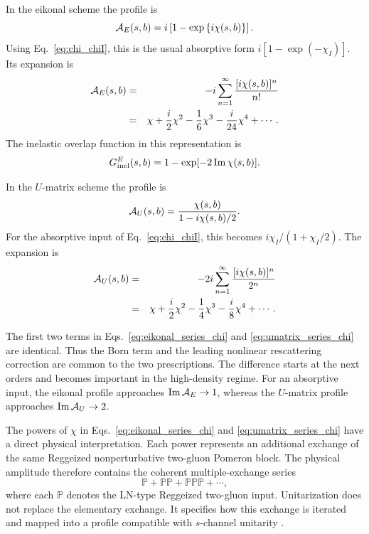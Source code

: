 \documentclass[aps,prd,twocolumn,superscriptaddress,longbibliography,nofootinbib]{revtex4-2}
\begin{document}
In the eikonal scheme the profile is
\begin{equation}
{\cal A}_E(s,b)
=
i\left[
1-\exp\left\{i\chi(s,b)\right\}
\right].
\label{eq:eikonal_profile}
\end{equation}
Using Eq.~\eqref{eq:chi_chiI}, this is the usual absorptive form
$i[1-\exp(-\chi_I)]$. Its expansion is
\begin{eqnarray}
{\cal A}_E(s,b) &=& -i\sum_{n=1}^{\infty} \frac{[i\chi(s,b)]^n}{n!} \nonumber \\
 &=& \chi + \frac{i}{2}\chi^2 - \frac{1}{6}\chi^3 - \frac{i}{24}\chi^4 + \cdots .
\label{eq:eikonal_series_chi}
\end{eqnarray}
The inelastic overlap function in this representation is
\begin{equation}
G_{\rm inel}^{E}(s,b) = 1-\exp[-2\,\mbox{Im}\,\chi(s,b)] .
\label{eq:ginel_eik}
\end{equation}

In the $U$-matrix scheme the profile is
\begin{equation}
{\cal A}_U(s,b) = \frac{\chi(s,b)}{1-i\chi(s,b)/2}.
\label{eq:umatrix_profile}
\end{equation}
For the absorptive input of Eq.~\eqref{eq:chi_chiI}, this becomes
$i\chi_I/(1+\chi_I/2)$. The expansion is
\begin{eqnarray}
{\cal A}_U(s,b) &=& -2i\sum_{n=1}^{\infty} \frac{[i\chi(s,b)]^n}{2^n} \nonumber \\
&=& \chi + \frac{i}{2}\chi^2 - \frac{1}{4}\chi^3 - \frac{i}{8}\chi^4 + \cdots .
\label{eq:umatrix_series_chi}
\end{eqnarray}

The first two terms in Eqs.~\eqref{eq:eikonal_series_chi} and
\eqref{eq:umatrix_series_chi} are identical. Thus the Born term and the
leading nonlinear rescattering correction are common to the two
prescriptions. The difference starts at the next orders and becomes
important in the high-density regime. For an absorptive input, the
eikonal profile approaches $\mbox{Im}\,{\cal A}_E\to 1$, whereas the
$U$-matrix profile approaches $\mbox{Im}\,{\cal A}_U\to 2$.


The powers of $\chi$ in Eqs.~\eqref{eq:eikonal_series_chi} and
\eqref{eq:umatrix_series_chi} have a direct physical interpretation.
Each power represents an additional exchange of the same Reggeized
nonperturbative two-gluon Pomeron block. The physical amplitude
therefore contains the coherent multiple-exchange series
\begin{equation}
{\mathbb P}+{\mathbb P}{\mathbb P}
+{\mathbb P}{\mathbb P}{\mathbb P}+\cdots ,
\label{eq:pomeron_series}
\end{equation}
where each ${\mathbb P}$ denotes the LN-type Reggeized two-gluon input.
Unitarization does not replace the elementary exchange. It specifies how
this exchange is iterated and mapped into a profile compatible with
$s$-channel unitarity \cite{luna2026a}.
\end{document}
